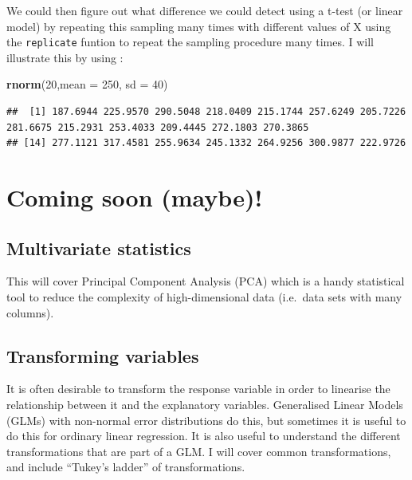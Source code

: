 \documentclass[
  a4paperpaper,
]{book}
\newenvironment{Shaded}{\begin{snugshade}}{\end{snugshade}}
\newcommand{\DataTypeTok}[1]{\textcolor[rgb]{0.13,0.29,0.53}{#1}}
\newcommand{\DecValTok}[1]{\textcolor[rgb]{0.00,0.00,0.81}{#1}}
\newcommand{\KeywordTok}[1]{\textcolor[rgb]{0.13,0.29,0.53}{\textbf{#1}}}
\newcommand{\NormalTok}[1]{#1}
\begin{document}
We could then figure out what difference we could detect using a t-test (or linear model) by repeating this sampling many times with different values of X using the \texttt{replicate} funtion to repeat the sampling procedure many times. I will illustrate this by using :

\begin{Shaded}
\begin{Highlighting}[]
\KeywordTok{rnorm}\NormalTok{(}\DecValTok{20}\NormalTok{,}\DataTypeTok{mean =} \DecValTok{250}\NormalTok{, }\DataTypeTok{sd =} \DecValTok{40}\NormalTok{)}
\end{Highlighting}
\end{Shaded}

\begin{verbatim}
##  [1] 187.6944 225.9570 290.5048 218.0409 215.1744 257.6249 205.7226 281.6675 215.2931 253.4033 209.4445 272.1803 270.3865
## [14] 277.1121 317.4581 255.9634 245.1332 264.9256 300.9877 222.9726
\end{verbatim}

\hypertarget{coming-soon-maybe}{%
\chapter{Coming soon (maybe)!}\label{coming-soon-maybe}}

\hypertarget{multivariate-statistics}{%
\section{Multivariate statistics}\label{multivariate-statistics}}

This will cover Principal Component Analysis (PCA) which is a handy statistical tool to reduce the complexity of high-dimensional data (i.e.~data sets with many columns).

\hypertarget{transforming-variables}{%
\section{Transforming variables}\label{transforming-variables}}

It is often desirable to transform the response variable in order to linearise the relationship between it and the explanatory variables. Generalised Linear Models (GLMs) with non-normal error distributions do this, but sometimes it is useful to do this for ordinary linear regression. It is also useful to understand the different transformations that are part of a GLM. I will cover common transformations, and include ``Tukey's ladder'' of transformations.
\end{document}
